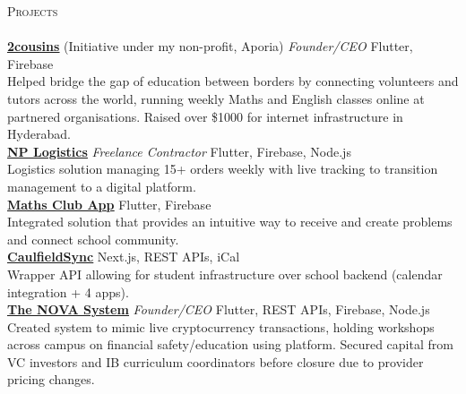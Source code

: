 \documentclass[a4paper]{article}
\newcommand{\lineunder} {
    \vspace*{-8pt} \\
    \hspace*{-10pt} \hrulefill \\
}
\newcommand{\header} [1] {
    {\hspace*{-10pt}\vspace*{6pt} \textsc{#1}}
    \vspace*{-6pt} \lineunder
}
\begin{document}
\header{Projects}
\href{https://2cousins.org/}{\textbf{\ul{2cousins}}} (Initiative under my non-profit, Aporia) \textit{Founder/CEO} {\textsl{\hfill} Flutter, Firebase}\\
Helped bridge the gap of education between borders by connecting volunteers and tutors across the world, running weekly Maths and English classes online at partnered organisations.
Raised over \$1000 for internet infrastructure in Hyderabad.\\
\vspace*{1.5mm}
\href{https://nplogistics.com.au}{\textbf{\ul{NP Logistics}}} \textit{Freelance Contractor} {\textsl{\hfill} Flutter, Firebase, Node.js}\\
Logistics solution managing 15+ orders weekly with live tracking to transition management to a digital platform.\\
\vspace*{1.5mm}
\href{https://github.com/cgs-math/app}{\textbf{\ul{Maths Club App}}} {\textsl{\hfill} Flutter, Firebase}\\
Integrated solution that provides an intuitive way to receive and create problems and connect school community.\\
\vspace*{1.5mm}
\href{https://caulfieldsync.vercel.app/}{\textbf{\ul{CaulfieldSync}}} {\textsl{\hfill} Next.js, REST APIs, iCal}\\
Wrapper API allowing for student infrastructure over school backend (calendar integration + 4 apps).\\
\vspace*{1.5mm}
\href{https://the-nova-system.github.io/}{\textbf{\ul{The NOVA System}}} \textit{Founder/CEO} {\textsl{\hfill} Flutter, REST APIs, Firebase, Node.js}\\
Created system to mimic live cryptocurrency transactions, holding workshops across campus on financial safety/education using platform.
Secured capital from VC investors and IB curriculum coordinators before closure due to provider pricing changes.\\

\end{document}
